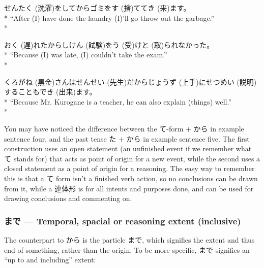 \documentclass[11pt, b5paper, twoside, openright, onecolumn]{book}
\makeatletter
\newcommand*{\rubystack}[2]{{\relscale{0.5}%
  \begin{tabular}[b]{@{}c@{}}%
    {#1}\\%
   {\textscale{2}{#2}}%
  \end{tabular}}%
}
\DeclareRobustCommand*{\ruby}[2]{%
  \mbox{%
    \setlength{\parskip}{0ex}%
    \BeginAccSupp{method=pdfstringdef,ActualText={#1}}%
      \rubystack{\phantom{#2}}{#1}%
      \llap{%
        \rubystack{#2}{\phantom{#1}}%
      }%
    \EndAccSupp{}%
  }%
}
\renewcommand*{\ruby}[2]{#2 (#1)}%
\newenvironment{exampleblock}{
\setlength{\parindent}{0.6in}
\begin{minipage}[t]{\dimexpr\textwidth-\parindent}}
{\end{minipage}}
\makeatother
\begin{document}
\begin{exampleblock}
\ruby{洗濯}{せんたく}をしてからゴミを\ruby{捨}{す}てて\ruby{来}{き}ます。 \\* 
“After (I) have done the laundry (I)’ll go throw out the garbage.” \\* 
\end{exampleblock}
\vspace{0.2cm}

\begin{exampleblock}
\ruby{遅}{おく}れたから\ruby{試験}{しけん}を\ruby{受}{う}け\ruby{取}{と}られなかった。 \\* 
“Because (I) was late‚ (I) couldn’t take the exam.” \\* 
\end{exampleblock}
\vspace{0.2cm}

\begin{exampleblock}
\ruby{黒金}{くろがね}さんは\ruby{先生}{せんせい}だから\ruby{上手}{じょうず}に\ruby{説明}{せつめい}することも\ruby{出来}{でき}ます。 \\* 
“Because Mr. Kurogane is a teacher‚ he can also explain (things) well.” \\* 
\end{exampleblock}
\vspace{0.2cm}

You may have noticed the difference between the て-form + から in example sentence four‚ and the past tense た + から in example sentence five. The first construction uses an open statement (an unfinished event if we remember what て stands for) that acts as point of origin for a new event‚ while the second uses a closed statement as a point of origin for a reasoning. The easy way to remember this is that a て form isn’t a finished verb action‚ so no conclusions can be drawn from it‚ while a 連体形 is for all intents and purposes done‚ and can be used for drawing conclusions and commenting on.

\subsubsection{まで — Temporal‚ spacial or reasoning extent (inclusive)}

The counterpart to から is the particle まで‚ which signifies the extent and thus end of something‚ rather than the origin. To be more specific‚ まで signifies an “up to and including” extent:
\end{document}
